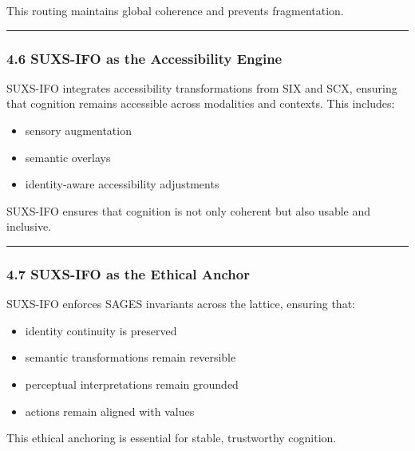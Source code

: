 This routing maintains global coherence and prevents fragmentation.

\begin{center}\rule{0.5\linewidth}{0.5pt}\end{center}

\subsubsection{4.6 SUXS-IFO as the Accessibility Engine}\label{suxs-ifo-as-the-accessibility-engine}

SUXS-IFO integrates accessibility transformations from SIX and SCX, ensuring that cognition remains accessible across modalities and contexts. This includes:

\begin{itemize}
\tightlist
\item
  sensory augmentation\\
\item
  semantic overlays\\
\item
  identity‑aware accessibility adjustments
\end{itemize}

SUXS-IFO ensures that cognition is not only coherent but also usable and inclusive.

\begin{center}\rule{0.5\linewidth}{0.5pt}\end{center}

\subsubsection{4.7 SUXS-IFO as the Ethical Anchor}\label{suxs-ifo-as-the-ethical-anchor}

SUXS-IFO enforces SAGES invariants across the lattice, ensuring that:

\begin{itemize}
\tightlist
\item
  identity continuity is preserved\\
\item
  semantic transformations remain reversible\\
\item
  perceptual interpretations remain grounded\\
\item
  actions remain aligned with values
\end{itemize}

This ethical anchoring is essential for stable, trustworthy cognition.

